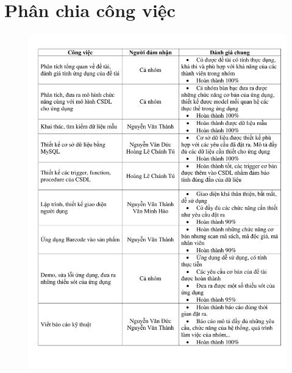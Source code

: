 \documentclass[12pt]{report}
\begin{document}
	\section*{Phân chia công việc}
			\begin{figure}[H]
				\centering
				\includegraphics[scale=0.8]{images/phanchiacongviec.pdf}
				\label{fig:work}
			\end{figure}
	\newpage
\end{document}
